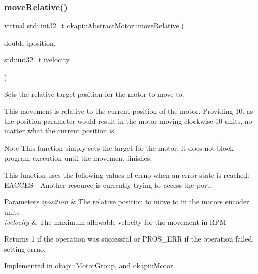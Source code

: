 \mbox{\label{classokapi_1_1AbstractMotor_a5a65d70a30f536593326cb754700e240}} 
\subsubsection{\texorpdfstring{moveRelative()}{moveRelative()}}
{\footnotesize\ttfamily virtual std\+::int32\+\_\+t okapi\+::\+Abstract\+Motor\+::move\+Relative (\begin{DoxyParamCaption}\item[{double}]{iposition,  }\item[{std\+::int32\+\_\+t}]{ivelocity }\end{DoxyParamCaption})\hspace{0.3cm}{\ttfamily [pure virtual]}}

Sets the relative target position for the motor to move to.

This movement is relative to the current position of the motor. Providing 10. as the position parameter would result in the motor moving clockwise 10 units, no matter what the current position is.

\begin{DoxyNote}{Note}
This function simply sets the target for the motor, it does not block program execution until the movement finishes.
\end{DoxyNote}
This function uses the following values of errno when an error state is reached\+: E\+A\+C\+C\+ES -\/ Another resource is currently trying to access the port.


\begin{DoxyParams}{Parameters}
{\em iposition} & The relative position to move to in the motor\textquotesingle{}s encoder units \\
\hline
{\em ivelocity} & The maximum allowable velocity for the movement in R\+PM \\
\hline
\end{DoxyParams}
\begin{DoxyReturn}{Returns}
1 if the operation was successful or P\+R\+O\+S\+\_\+\+E\+RR if the operation failed, setting errno. 
\end{DoxyReturn}


Implemented in \mbox{\hyperlink{classokapi_1_1MotorGroup_a4295103133b5cb721dfb457a8cc8c2bc}{okapi\+::\+Motor\+Group}}, and \mbox{\hyperlink{classokapi_1_1Motor_a40f6f70ed9b12d1834551d1232303ef1}{okapi\+::\+Motor}}.

